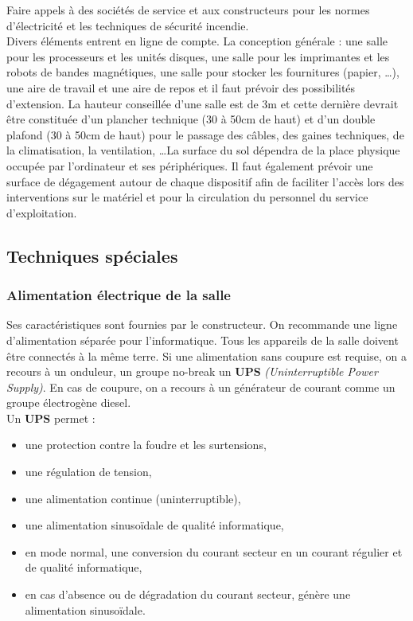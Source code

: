 \documentclass[10pt,a4paper,oneside,titlepage]{report}
\newcommand{\titre}[1]{\textcolor{title}{#1}}
\newcommand{\strong}[1]{\textbf{\titre{#1}}}
\begin{document}
Faire appels à des sociétés de service et aux constructeurs pour les normes
d'électricité et les techniques de sécurité incendie.\\
Divers éléments entrent en ligne de compte. La conception générale : une salle
pour les processeurs et les unités disques, une salle pour les imprimantes et
les robots de bandes magnétiques, une salle pour stocker les fournitures
(papier, \dots), une aire de travail et une aire de repos et il faut prévoir des
possibilités d'extension. La hauteur conseillée d'une salle est de 3m et cette
dernière devrait être constituée d'un plancher technique (30 à 50cm de haut)
et d'un double plafond (30 à 50cm de haut) pour le passage des câbles, des
gaines techniques, de la climatisation, la ventilation, \dots La surface du sol
dépendra de la place physique occupée par l'ordinateur et ses périphériques. Il
faut également prévoir une surface de dégagement autour de chaque dispositif
afin de faciliter l'accès lors des interventions sur le matériel et pour la
circulation du personnel du service d'exploitation.

\subsection{Techniques spéciales}

\subsubsection{Alimentation électrique de la salle}

Ses caractéristiques sont fournies par le constructeur. On recommande une ligne
d'alimentation séparée pour l'informatique. Tous les appareils de la salle
doivent être connectés à la même terre. Si une alimentation sans coupure est
requise, on a recours à un onduleur, un groupe no-break un \strong{UPS}
\textit{(Uninterruptible Power Supply)}. En cas de coupure, on a recours à un
générateur de courant comme un groupe électrogène diesel.\\

Un \textbf{UPS} permet :\begin{itemize}
\item une protection contre la foudre et les surtensions,
\item une régulation de tension,
\item une alimentation continue (uninterruptible),
\item une alimentation sinusoïdale de qualité informatique,
\item en mode normal, une conversion du courant secteur en un courant régulier
et de qualité informatique,
\item en cas d'absence ou de dégradation du courant secteur, génère une
alimentation sinusoïdale.
\end{itemize}
\end{document}
